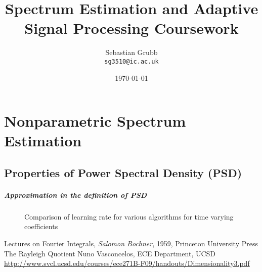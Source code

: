 \documentclass[10pt,twoside,a4paper]{report}
\author{Sebastian Grubb\\
  \texttt{sg3510@ic.ac.uk}}
\title{Spectrum Estimation and Adaptive Signal Processing Coursework}
\date{\today}
\begin{document}
\maketitle
\tableofcontents
\newpage
\chapter{Nonparametric Spectrum Estimation}
\section{Properties of Power Spectral Density (PSD)}
\paragraph{Approximation in the definition of PSD}

\begin{figure}[h!]
\centering
\resizebox{\textwidth}{!}{}
\caption{Comparison of learning rate for various algorithms for time varying coefficients}
\label{fig:3_2e}
\end{figure}


\begin{thebibliography}{3}
 Lectures on Fourier Integrals, \textit{Salomon Bochner}, 1959, Princeton University Press
 The Rayleigh Quotient Nuno Vasconcelos, ECE Department, UCSD \url{http://www.svcl.ucsd.edu/courses/ece271B-F09/handouts/Dimensionality3.pdf}
\end{thebibliography}
\end{document}
